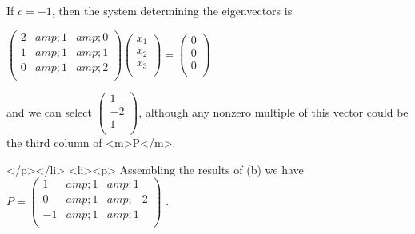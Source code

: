 If  \(c = -1\), then the system determining the eigenvectors is 



\(\left(
\begin{array}{ccc}
 2 &amp; 1 &amp; 0 \\
 1 &amp; 1 &amp; 1 \\
 0 &amp; 1 &amp; 2 \\
\end{array}
\right)\left(
\begin{array}{c}
 x_1 \\
 x_2 \\
 x_3 \\
\end{array}
\right)=\left(
\begin{array}{c}
 0 \\
 0 \\
 0 \\
\end{array}
\right)\) 



and we can select \(\left(
\begin{array}{c}
 1 \\
 -2 \\
 1 \\
\end{array}
\right)\),  although any nonzero multiple of this vector could be the third column of <m>P</m>. 

</p></li>
<li><p> Assembling the results of (b) we have \(P=\left(
\begin{array}{ccc}
 1 &amp; 1 &amp; 1 \\
 0 &amp; 1 &amp; -2 \\
 -1 &amp; 1 &amp; 1 \\
\end{array}
\right)\) .



